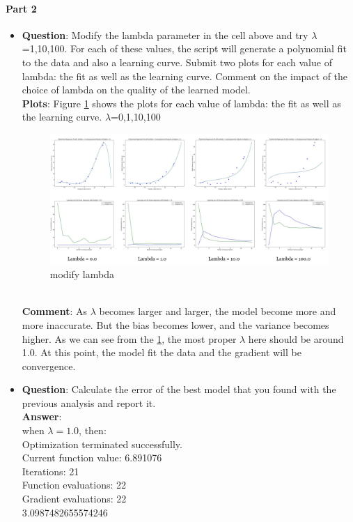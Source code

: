 \documentclass[paper=a4, fontsize=11pt]{scrartcl} %
\numberwithin{equation}{section} %
\numberwithin{figure}{section} %
\numberwithin{table}{section} %
\begin{document}
\paragraph{\textbf{Part 2}}
\begin{itemize}
	\item
        \textbf{Question}: Modify the lambda parameter in the cell above and try $\lambda$=1,10,100. For each of these values, the script will generate a polynomial fit to the data and also a learning curve. Submit two plots for each value of lambda: the fit as well as the learning curve. Comment on the impact of the choice of lambda on the quality of the learned model.
    \\ \textbf{Plots}:
        Figure \ref{fig:modifyLambda} shows the plots for each value of lambda: the fit as well as the learning curve. $\lambda$=0,1,10,100
        \begin{figure}
     		\centering
     		\includegraphics[scale=0.3]{Comparation2.jpg}
     		\caption{modify lambda}
     		\label{fig:modifyLambda}
     	\end{figure}
     \\ \textbf{Comment}: As $\lambda$ becomes larger and larger, the model become more and more inaccurate. But the bias becomes lower, and the variance becomes higher. As we can see from the \ref{fig:modifyLambda}, the most proper $\lambda$ here should be around 1.0. At this point, the model fit the data and the gradient will be convergence.

    \item
        \textbf{Question}: Calculate the error of the best model that you found with the previous analysis and report it.
     \\ \textbf{Answer}:
        \\ when $\lambda=1.0$, then:
        \\Optimization terminated successfully.
         \\ Current function value: 6.891076
         \\ Iterations: 21
         \\ Function evaluations: 22
         \\ Gradient evaluations: 22
         \\ 3.0987482655574246


\end{itemize}
\end{document}
